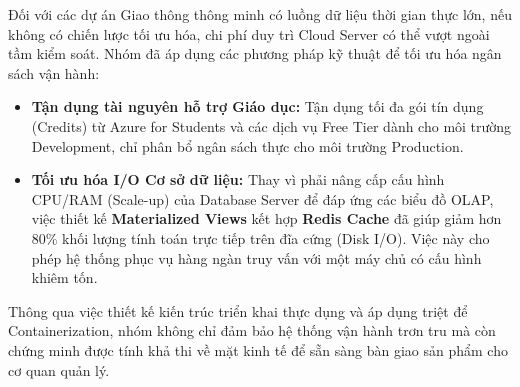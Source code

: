 Đối với các dự án Giao thông thông minh có luồng dữ liệu thời gian thực lớn, nếu không có chiến lược tối ưu hóa, chi phí duy trì Cloud Server có thể vượt ngoài tầm kiểm soát. Nhóm đã áp dụng các phương pháp kỹ thuật để tối ưu hóa ngân sách vận hành:

\begin{itemize}
    \item \textbf{Tận dụng tài nguyên hỗ trợ Giáo dục:} Tận dụng tối đa gói tín dụng (Credits) từ Azure for Students và các dịch vụ Free Tier dành cho môi trường Development, chỉ phân bổ ngân sách thực cho môi trường Production.
    \item \textbf{Tối ưu hóa I/O Cơ sở dữ liệu:} Thay vì phải nâng cấp cấu hình CPU/RAM (Scale-up) của Database Server để đáp ứng các biểu đồ OLAP, việc thiết kế \textbf{Materialized Views} kết hợp \textbf{Redis Cache} đã giúp giảm hơn 80\% khối lượng tính toán trực tiếp trên đĩa cứng (Disk I/O). Việc này cho phép hệ thống phục vụ hàng ngàn truy vấn với một máy chủ có cấu hình khiêm tốn.
\end{itemize}

Thông qua việc thiết kế kiến trúc triển khai thực dụng và áp dụng triệt để Containerization, nhóm không chỉ đảm bảo hệ thống vận hành trơn tru mà còn chứng minh được tính khả thi về mặt kinh tế để sẵn sàng bàn giao sản phẩm cho cơ quan quản lý.